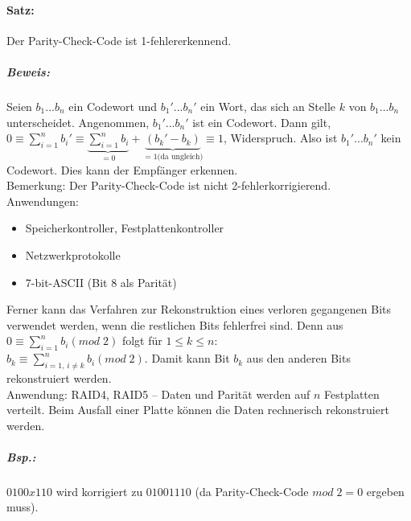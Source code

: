\documentclass{scrreprt}
\begin{document}
\paragraph{Satz:} Der Parity-Check-Code ist 1-fehlererkennend.
\subparagraph{Beweis:} Seien $b_1...b_n$ ein Codewort und $b_1'...b_n'$ ein Wort, das sich an Stelle $k$ von $b_1...b_n$ unterscheidet. Angenommen, $b_1'...b_n'$ ist ein Codewort. Dann gilt, $0\equiv \sum_{i=1}^{n}b_i'\equiv \underbrace{\sum_{i=1}^{n}b_i}_{=0}+\underbrace{(b_k'-b_k)}_{=1 \text{(da ungleich)}}\equiv 1$, Widerspruch. Also ist $b_1'...b_n'$ kein Codewort. Dies kann der Empfänger erkennen.\\
Bemerkung: Der Parity-Check-Code ist nicht 2-fehlerkorrigierend.\\
Anwendungen: 
\begin{itemize}
\item Speicherkontroller, Festplattenkontroller
\item Netzwerkprotokolle
\item 7-bit-ASCII (Bit 8 als Parität)
\end{itemize}
Ferner kann das Verfahren zur Rekonstruktion eines verloren gegangenen Bits verwendet werden, wenn die restlichen Bits fehlerfrei sind. Denn aus $0\equiv \sum_{i=1}^{n} b_i (mod\;2)$ folgt für $1\leq k \leq n$: \\
$b_k\equiv \sum_{i=1,\, i\not =k}^{n} b_i (mod\;2)$. Damit kann Bit $b_k$ aus den anderen Bits rekonstruiert werden.\\
Anwendung: RAID4, RAID5 -- Daten und Parität werden auf $n$ Festplatten verteilt. Beim Ausfall einer Platte können die Daten rechnerisch rekonstruiert werden.\\
\subparagraph{Bsp.:} $0100x110$ wird korrigiert zu $01001110$ (da Parity-Check-Code $mod\;2=0$ ergeben muss).
\end{document}

